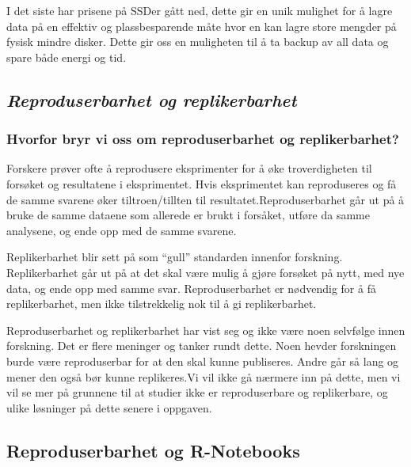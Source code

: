 \documentclass[
  norsk,
]{article}
\begin{document}
I det siste har prisene på SSDer gått ned, dette gir en unik mulighet
for å lagre data på en effektiv og plassbesparende måte hvor en kan
lagre store mengder på fysisk mindre disker. Dette gir oss en muligheten
til å ta backup av all data og spare både energi og tid.

\hypertarget{reproduserbarhet-og-replikerbarhet}{%
\subsection{\texorpdfstring{\emph{Reproduserbarhet og
replikerbarhet}}{Reproduserbarhet og replikerbarhet}}\label{reproduserbarhet-og-replikerbarhet}}

\hypertarget{hvorfor-bryr-vi-oss-om-reproduserbarhet-og-replikerbarhet}{%
\subsubsection{\texorpdfstring{\textbf{Hvorfor bryr vi oss om
reproduserbarhet og
replikerbarhet?}}{Hvorfor bryr vi oss om reproduserbarhet og replikerbarhet?}}\label{hvorfor-bryr-vi-oss-om-reproduserbarhet-og-replikerbarhet}}

Forskere prøver ofte å reprodusere eksprimenter for å øke troverdigheten
til forsøket og resultatene i eksprimentet. Hvis eksprimentet kan
reproduseres og få de samme svarene øker tiltroen/tillten til
resultatet.Reproduserbarhet går ut på å bruke de samme dataene som
allerede er brukt i forsåket, utføre da samme analysene, og ende opp med
de samme svarene.

Replikerbarhet blir sett på som ``gull'' standarden innenfor forskning.
Replikerbarhet går ut på at det skal være mulig å gjøre forsøket på
nytt, med nye data, og ende opp med samme svar. Reproduserbarhet er
nødvendig for å få replikerbarhet, men ikke tilstrekkelig nok til å gi
replikerbarhet.

Reproduserbarhet og replikerbarhet har vist seg og ikke være noen
selvfølge innen forskning. Det er flere meninger og tanker rundt dette.
Noen hevder forskningen burde være reproduserbar for at den skal kunne
publiseres. Andre går så lang og mener den også bør kunne replikeres.Vi
vil ikke gå nærmere inn på dette, men vi vil se mer på grunnene til at
studier ikke er reproduserbare og replikerbare, og ulike løsninger på
dette senere i oppgaven.

\hypertarget{reproduserbarhet-og-r-notebooks}{%
\subsection{\texorpdfstring{\textbf{Reproduserbarhet og
R-Notebooks}}{Reproduserbarhet og R-Notebooks}}\label{reproduserbarhet-og-r-notebooks}}
\end{document}

